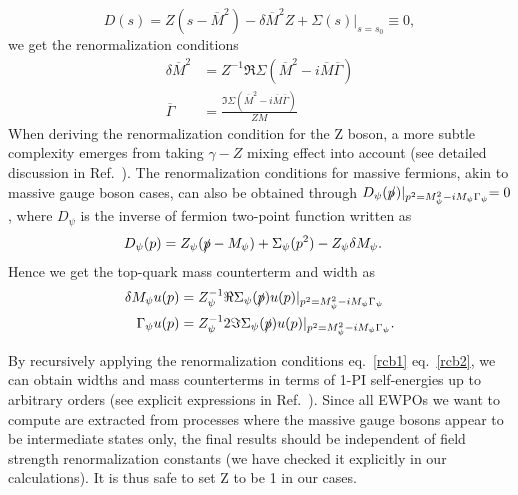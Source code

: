 \documentclass[Physsubmission, Phys]{SciPost}
\newcommand{\SLASH}[2]{\makebox[#2ex][l]{$#1$}/}
\newcommand{\pslash}{\SLASH{p}{.2}}
\begin{document}
\begin{equation}
D(s)=Z(s-\overline{M}^2) - \delta \overline{M}^2 Z+\Sigma(s)\lvert_{s=s_0}\equiv0, 
\end{equation}
we get the renormalization conditions
\begin{align}
\delta \overline{M}^2&=Z^{-1}\Re \Sigma(\overline{M}^2-i \overline{M}\overline{\Gamma})\label{rcb1}\\
\overline{\Gamma}&=\frac{\Im\Sigma(\overline{M}^2-i \overline{M}\overline{\Gamma})}{ZM}\label{rcb2}
\end{align}
When deriving the renormalization condition for the Z boson, a more subtle complexity emerges from taking $\gamma-Z$ mixing effect into account (see detailed discussion in Ref.~\cite{Chen:2020xzx}).
The renormalization conditions for massive fermions, akin to massive gauge boson cases, can also be obtained through $D_{\psi}(\pslash)\lvert_{p^2=M_{\psi}^2-iM_{\psi}\Gamma_{\psi}}=0$, where $D_{\psi}$ is the inverse of fermion two-point function written as
\begin{equation}
\begin{split}\label{eq:topp}
D_{\psi}(p)&=Z_{\psi}(\slashed{p}-M_\psi)+\Sigma_{\psi}(p^2)-Z_{\psi}\delta M_{\psi}.
\end{split}
\end{equation}
Hence we get the top-quark mass counterterm and width as
\begin{equation}
\begin{split}
\delta M_\psi u(p) &=Z_{\psi}^{-1}\Re{\Sigma_{\psi}(\slashed{p})u(p)\rvert_{p^2=M_{\psi}^2-iM_{\psi}\Gamma_{\psi}}}\\
\Gamma_\psi u(p)&=Z_{\psi}^{-1}2 \Im \Sigma_{\psi}(\slashed{p})u(p) \rvert_{p^2=M_{\psi}^2-iM_{\psi}\Gamma_{\psi}}.
\end{split}
\end{equation}

By recursively applying the renormalization conditions eq.~\eqref{rcb1} eq.~\eqref{rcb2}, we can obtain widths and mass counterterms in terms of 1-PI self-energies up to arbitrary orders (see explicit expressions in Ref.~\cite{Chen:2020xzx}). Since all EWPOs we want to compute are extracted from processes where the massive gauge bosons appear to be intermediate states only, the final results should be independent of field strength renormalization constants (we have checked it explicitly in our calculations). It is thus safe to set Z to be 1 in our cases.
\end{document}
